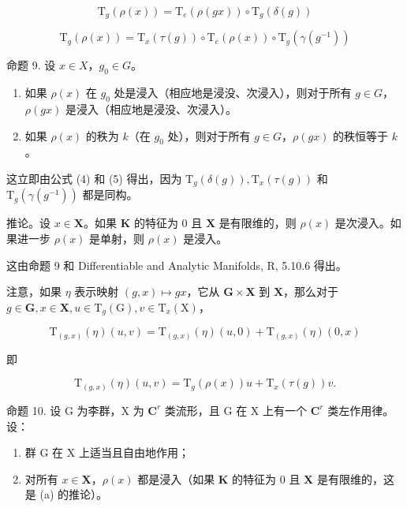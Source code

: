 \[
\mathrm{T} _ {g} (\rho (x)) = \mathrm{T} _ {e} (\rho (g x)) \circ \mathrm{T} _ {g} (\delta (g))
\]

\[
\mathrm{T} _ {g} (\rho (x)) = \mathrm{T} _ {x} (\tau (g)) \circ \mathrm{T} _ {e} (\rho (x)) \circ \mathrm{T} _ {g} (\gamma (g ^ {- 1}))\tag{5}
\]

命题 9. 设 \(x \in X\)，\(g_0 \in G\)。

\begin{enumerate}
\def\labelenumi{(\roman{enumi})}
\item
  如果 \(\rho(x)\) 在 \(g_0\) 处是浸入（相应地是浸没、次浸入），则对于所有 \(g \in G\)，\(\rho(gx)\) 是浸入（相应地是浸没、次浸入）。
\item
  如果 \(\rho(x)\) 的秩为 \(k\)（在 \(g_0\) 处），则对于所有 \(g \in G\)，\(\rho(gx)\) 的秩恒等于 \(k\)。
\end{enumerate}

这立即由公式 (4) 和 (5) 得出，因为 \(\mathrm{T}_{g}(\delta(g)),\mathrm{T}_{x}(\tau(g))\) 和 \(\mathrm{T}_{g}(\gamma(g^{-1}))\) 都是同构。

推论。设 \(x \in \mathbf{X}\)。如果 \(\mathbf{K}\) 的特征为 0 且 \(\mathbf{X}\) 是有限维的，则 \(\rho(x)\) 是次浸入。如果进一步 \(\rho(x)\) 是单射，则 \(\rho(x)\) 是浸入。

这由命题 9 和 Differentiable and Analytic Manifolds, R, 5.10.6 得出。

注意，如果 \(\eta\) 表示映射 \((g,x)\mapsto gx\)，它从 \(\mathbf{G}\times \mathbf{X}\) 到 \(\mathbf{X}\)，那么对于 \(g\in \mathbf{G},x\in \mathbf{X},u\in \mathrm{T}_g(\mathrm{G}),v\in \mathrm{T}_x(\mathrm{X})\)，

\[
\mathrm{T} _ {(g, x)} (\eta) (u, v) = \mathrm{T} _ {(g, x)} (\eta) (u, 0) + \mathrm{T} _ {(g, x)} (\eta) (0, x)
\]

即

\[
\mathrm{T} _ {(g, x)} (\eta) (u, v) = \mathrm{T} _ {g} (\rho (x)) u + \mathrm{T} _ {x} (\tau (g)) v.\tag{6}
\]

命题 10. 设 G 为李群，X 为 \(\mathbf{C}^r\) 类流形，且 G 在 X 上有一个 \(\mathbf{C}^r\) 类左作用律。设：

\begin{enumerate}
\def\labelenumi{(\alph{enumi})}
\item
  群 G 在 X 上适当且自由地作用；
\item
  对所有 \(x \in \mathbf{X}\)，\(\rho(x)\) 都是浸入（如果 \(\mathbf{K}\) 的特征为 0 且 \(\mathbf{X}\) 是有限维的，这是 (a) 的推论）。
\end{enumerate}

